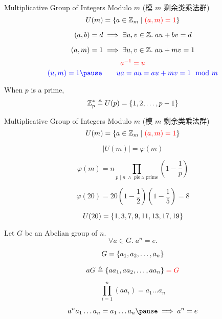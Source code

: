 \begin{frame}
  \begin{exampleblock}{Multiplicative Group of Integers Modulo $m$ (模 $m$ 剩余类乘法群)}
    \[
      U(m) = \{a \in \mathbb{Z}_{m} \mid \textcolor{red}{(a, m) = 1}\}
    \]
  \end{exampleblock}

  \pause
  \vspace{0.60cm}
  \begin{theorem}
    \[
      (a, b) = d \implies \exists u, v \in \mathbb{Z}.\; au + bv = d
    \]
  \end{theorem}

  \pause
  \[
    (a, m) = 1 \implies \exists u, v \in \mathbb{Z}.\; au + mv = 1
  \]
  \pause
  \[
    \textcolor{red}{a^{-1} = u}
  \]
  \pause
  \[
    \blue{(u, m) = 1 \pause\qquad ua = au = au + mv = 1\mod{m}}
  \]
\end{frame}

\begin{frame}{}
  \begin{center}
    When $p$ is a prime,
    \[
      \mathbb{Z}^{\ast}_{p} \triangleq U(p) = \{1, 2, \dots, p-1\}
    \]
  \end{center}
\end{frame}

\begin{frame}
  \begin{exampleblock}{Multiplicative Group of Integers Modulo $m$ (模 $m$ 剩余类乘法群)}
    \[
      U(m) = \{a \in \mathbb{Z}_{m} \mid \textcolor{red}{(a, m) = 1}\}
    \]
  \end{exampleblock}

  \pause
  \[
    \big\lvert U(m) \big\rvert = \varphi(m)
  \]

  \pause
  \vspace{0.50cm}
  \begin{definition}
    \[
      \varphi(m) = n \prod_{p \mid n \;\land\; p \text{is a prime}}
        \left(1 - \frac{1}{p} \right)
    \]
  \end{definition}

  \pause
  \[
    \varphi(20) = 20 (1 - \frac{1}{2}) (1 - \frac{1}{5}) = 8
  \]

  \pause
  \[
    U(20) = \{1, 3, 7, 9, 11, 13, 17, 19\}
  \]
\end{frame}

\begin{frame}
  \begin{theorem}
    Let $G$ be an Abelian group of  $n$.
    \[
      \forall a \in G.\; a^n = e.
    \]
  \end{theorem}

  \pause
  \[
    G = \{a_{1}, a_{2}, \dots, a_{n}\}
  \]

  \pause
  \[
    aG \triangleq \{aa_{1}, aa_{2}, \dots, aa_{n}\} \;\textcolor{red}{= G}
  \]

  \pause
  \[
    \prod_{i=1}^{n} (a a_i) = a_{1} \dots a_{n}
  \]

  \pause
  \[
    a^{n} a_{1} \dots a_{n} = a_{1} \dots a_{n} \pause \implies a^{n} = e
  \]
\end{frame}

